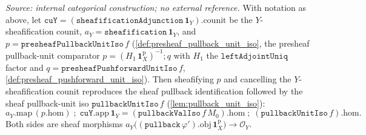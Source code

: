 \begin{lemma}

  \label{lem:presheaf_pullback_unit_iso_sheafify_reconcile}
  \textit{Source: internal categorical construction; no external reference.}
  With notation as above, let \(\mathtt{cuY} = (\mathtt{sheafificationAdjunction}\,\mathbf 1_Y).\mathrm{counit}\)
  be the $Y$-sheafification counit, \(a_Y = \mathtt{sheafification}\,\mathbf 1_Y\), and
  \(p = \mathtt{presheafPullbackUnitIso}\,f\) (\cref{def:presheaf_pullback_unit_iso}, the presheaf
  pullback-unit comparator \(p = (H_1\,\mathbf 1^{\mathrm p}_X)^{-1} \mathbin{;} q\) with \(H_1\) the
  \(\mathtt{leftAdjointUniq}\) factor and \(q = \mathtt{presheafPushforwardUnitIso}\,f\),
  \cref{def:presheaf_pushforward_unit_iso}). Then sheafifying \(p\) and cancelling the
  $Y$-sheafification counit reproduces the sheaf pullback identification followed by the sheaf
  pullback-unit iso \(\mathtt{pullbackUnitIso}\,f\) (\cref{lem:pullback_unit_iso}):
  \[
    a_Y.\mathrm{map}\,(p.\mathrm{hom}) \;\mathbin{;}\; \mathtt{cuY}.\mathrm{app}\,\mathbf 1_Y
      = (\mathtt{pullbackValIso}\,f\,M_0).\mathrm{hom}
        \;\mathbin{;}\; (\mathtt{pullbackUnitIso}\,f).\mathrm{hom}.
  \]
  Both sides are sheaf morphisms
  \(a_Y\bigl((\mathtt{pullback}\,\varphi').\mathrm{obj}\,\mathbf 1^{\mathrm p}_X\bigr) \to \mathcal O_Y\).
\end{lemma}
